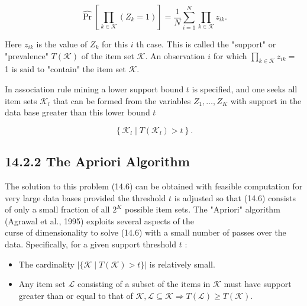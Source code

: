 \documentclass[10pt]{article}
\begin{document}
\begin{equation*}
\widehat{\operatorname{Pr}}\left[\prod_{k \in \mathcal{K}}\left(Z_{k}=1\right)\right]=\frac{1}{N} \sum_{i=1}^{N} \prod_{k \in \mathcal{K}} z_{i k} . \tag{14.5}
\end{equation*}


Here $z_{i k}$ is the value of $Z_{k}$ for this $i$ th case. This is called the "support" or "prevalence" $T(\mathcal{K})$ of the item set $\mathcal{K}$. An observation $i$ for which $\prod_{k \in \mathcal{K}} z_{i k}=$ 1 is said to "contain" the item set $\mathcal{K}$.

In association rule mining a lower support bound $t$ is specified, and one seeks all item sets $\mathcal{K}_{l}$ that can be formed from the variables $Z_{1}, \ldots, Z_{K}$ with support in the data base greater than this lower bound $t$


\begin{equation*}
\left\{\mathcal{K}_{l} \mid T\left(\mathcal{K}_{l}\right)>t\right\} . \tag{14.6}
\end{equation*}


\subsection*{14.2.2 The Apriori Algorithm}
The solution to this problem (14.6) can be obtained with feasible computation for very large data bases provided the threshold $t$ is adjusted so that (14.6) consists of only a small fraction of all $2^{K}$ possible item sets. The "Apriori" algorithm (Agrawal et al., 1995) exploits several aspects of the\\
curse of dimensionality to solve (14.6) with a small number of passes over the data. Specifically, for a given support threshold $t$ :

\begin{itemize}
  \item The cardinality $|\{\mathcal{K} \mid T(\mathcal{K})>t\}|$ is relatively small.
  \item Any item set $\mathcal{L}$ consisting of a subset of the items in $\mathcal{K}$ must have support greater than or equal to that of $\mathcal{K}, \mathcal{L} \subseteq \mathcal{K} \Rightarrow T(\mathcal{L}) \geq T(\mathcal{K})$.
\end{itemize}
\end{document}
